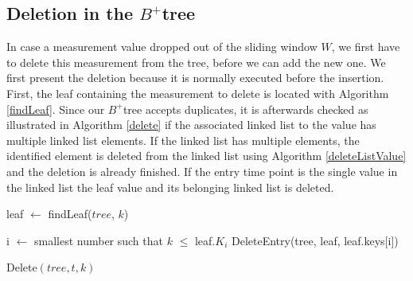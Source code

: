 \documentclass[abstracton,12pt,oneside]{scrreprt}
\begin{document}
\subsection{Deletion in the $B^+$tree}
\label{deleteTree}
In case a measurement value dropped out of the sliding window $W$, we first have to delete this measurement from the tree, before we can add the new one. We first present the deletion because it is normally executed before the insertion. \\
First, the leaf containing the measurement to delete is located with Algorithm \ref{findLeaf}. Since our $B^+$tree accepts duplicates, it is afterwards checked as illustrated in Algorithm \ref{delete} if the associated linked list to the value has multiple linked list elements. If the linked list has multiple elements, the identified element is deleted from the linked list using Algorithm \ref{deleteListValue} and the deletion is already finished. If the entry time point is the single value in the linked list the leaf value and its belonging linked list is deleted.

\begin{algorithm}[H]
	\IncMargin{1em}
	\SetAlgoLined
	\DontPrintSemicolon
	
	
	leaf $\leftarrow$ findLeaf($tree$, $k$)\; 
	
	i $\leftarrow$ smallest number such that $k$ $\leq$ leaf.$K_i$\;
	\BlankLine
	{
		DeleteEntry(tree, leaf, leaf.keys[i])\; 
	}	
	
	
	\caption{Delete$(tree, t, k)$}	\label{delete}
\end{algorithm}
\end{document}
